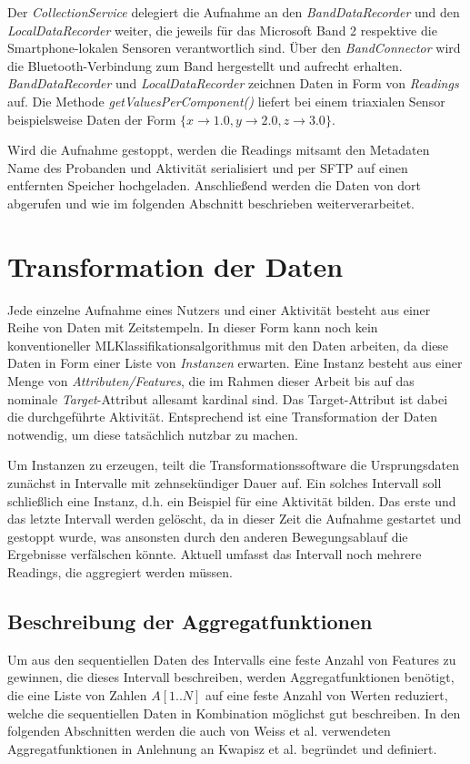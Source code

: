 Der \textit{CollectionService} delegiert die Aufnahme an den \textit{BandDataRecorder} und den \textit{LocalDataRecorder} weiter, die jeweils für das Microsoft Band 2 respektive die Smartphone-lokalen Sensoren verantwortlich sind. Über den \textit{BandConnector} wird die Bluetooth-Verbindung zum Band hergestellt und aufrecht erhalten. \textit{BandDataRecorder} und \textit{LocalDataRecorder} zeichnen Daten in Form von \textit{Readings} auf. Die Methode \textit{getValuesPerComponent()} liefert bei einem triaxialen Sensor beispielsweise Daten der Form $\{x \to 1.0, y \to 2.0, z \to 3.0\}$.

Wird die Aufnahme gestoppt, werden die Readings mitsamt den Metadaten Name des Probanden und Aktivität serialisiert und per SFTP auf einen entfernten Speicher hochgeladen. Anschließend werden die Daten von dort abgerufen und wie im folgenden Abschnitt beschrieben weiterverarbeitet.

\section{Transformation der Daten}
\label{sec:transformation}
Jede einzelne Aufnahme eines Nutzers und einer Aktivität besteht aus einer Reihe von Daten mit Zeitstempeln. In dieser Form kann noch kein konventioneller ML\hyph Klassifikationsalgorithmus mit den Daten arbeiten, da diese Daten in Form einer Liste von \textit{Instanzen} erwarten. Eine Instanz besteht aus einer Menge von \textit{Attributen/Features}, die im Rahmen dieser Arbeit bis auf das nominale \textit{Target}-Attribut allesamt kardinal sind. Das Target-Attribut ist dabei die durchgeführte Aktivität. Entsprechend ist eine Transformation der Daten notwendig, um diese tatsächlich nutzbar zu machen.

Um Instanzen zu erzeugen, teilt die Transformationssoftware die Ursprungsdaten zunächst in Intervalle mit zehnsekündiger Dauer auf. Ein solches Intervall soll schließlich eine Instanz, d.h. ein Beispiel für eine Aktivität bilden. Das erste und das letzte Intervall werden gelöscht, da in dieser Zeit die Aufnahme gestartet und gestoppt wurde, was ansonsten durch den anderen Bewegungsablauf die Ergebnisse verfälschen könnte. Aktuell umfasst das Intervall noch mehrere Readings, die aggregiert werden müssen.

\subsection{Beschreibung der Aggregatfunktionen}
Um aus den sequentiellen Daten des Intervalls eine feste Anzahl von Features zu gewinnen, die dieses Intervall beschreiben, werden Aggregatfunktionen benötigt, die eine Liste von Zahlen $A[1..N]$ auf eine feste Anzahl von Werten reduziert, welche die sequentiellen Daten in Kombination möglichst gut beschreiben. In den folgenden Abschnitten werden die auch von Weiss et al. verwendeten \cite{Weiss2016} Aggregatfunktionen in Anlehnung an Kwapisz et al. \cite{Kwapisz2011} begründet und definiert.
